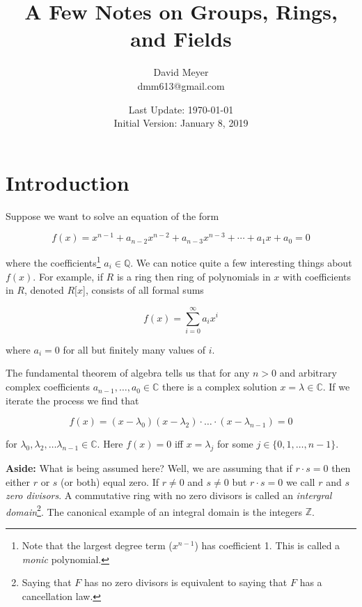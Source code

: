 \documentclass[11pt, oneside]{article}   	%
\title{A Few Notes on Groups, Rings, and Fields}
\author{David Meyer \\ dmm613@gmail.com}
\date{Last Update: \today \\
	 {\vspace{1.00mm} \small Initial Version: January 8, 2019}}
\theoremstyle{definition}
\begin{document}
\maketitle

\section{Introduction}
Suppose we want to solve an equation of the form

\begin{equation}
f(x) = x^{n-1} + a_{n-2}x^{n-2} + a_{n-3}x^{n-3} + 
       \cdots + a_{1}x + a_0 = 0
\label{eqn:f(x)}
\end{equation}

\bigskip
\noindent
where the coefficients\footnote{Note that the largest degree term
($x^{n-1}$) has coefficient 1. This is called a \emph{monic}
polynomial.}  $a_i \in \mathbb{Q}$.  We can notice quite a few
interesting things about $f(x)$.  For example, if $R$ is a ring
then ring of polynomials in $x$ with coefficients in $R$, denoted
$R[x$], consists of all formal sums

\begin{equation*}
f(x) = \sum\limits_{i = 0}^{\infty} a_ix^i
\end{equation*}

\bigskip
\noindent
where $a_i = 0$ for all but finitely many values of $i$.


\bigskip
\noindent
The fundamental theorem of algebra \cite{steed2014} tells us that
for any $n > 0$ and arbitrary complex coefficients $a_{n-1},
\hdots, a_0 \in \mathbb{C}$ there is a complex solution $x =
\lambda \in \mathbb{C}$. If we iterate the process we find that

\begin{equation}
f(x) = (x - \lambda_0)(x - \lambda_2) \cdot \hdots \cdot (x -
\lambda_{n - 1}) = 0 
\label{eqn:factorization}
\end{equation}

\bigskip
\noindent
for $\lambda_0, \lambda_2, \hdots \lambda_{n-1} \in \mathbb{C}$.
Here $f(x) = 0$ iff $x = \lambda_j$ for some $j \in \{0,1,\hdots, n-1\}$.

\bigskip
\noindent
\textbf{Aside:} What is being assumed here? Well, we are assuming
that if $r \cdot s = 0$ then either $r$ or $s$ (or both) equal
zero.  If $r \neq 0$ and $s \neq 0$ but $r \cdot s = 0$ we call
$r$ and $s$ \emph{zero divisors}. A commutative ring with no zero
divisors is called an \emph{intergral domain}\footnote{Saying
that $F$ has no zero divisors is equivalent to saying that $F$
has a cancellation law.}.  The canonical example of an integral
domain is the integers $\mathbb{Z}$.
\end{document}
